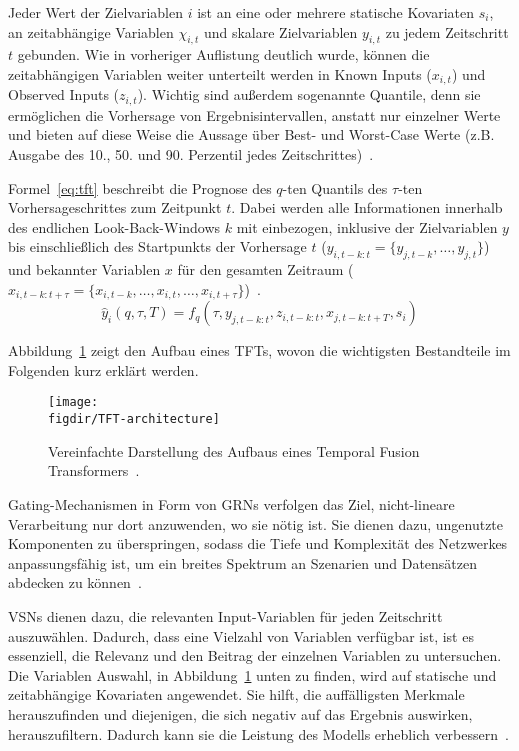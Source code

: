 Jeder Wert der Zielvariablen $i$ ist an eine oder mehrere statische Kovariaten $s_i$, an zeitabhängige Variablen $\chi_{i,t}$ und skalare Zielvariablen $y_{i,t}$ zu jedem Zeitschritt $t$ gebunden.
Wie in vorheriger Auflistung deutlich wurde, können die zeitabhängigen Variablen weiter unterteilt werden in Known Inputs ($x_{i,t}$) und Observed Inputs ($z_{i,t}$).
Wichtig sind außerdem sogenannte Quantile, denn sie ermöglichen die Vorhersage von Ergebnisintervallen, anstatt nur einzelner Werte und bieten auf diese Weise die Aussage über Best- und Worst-Case Werte (z.B. Ausgabe des 10., 50. und 90. Perzentil jedes Zeitschrittes)~\cite{Lim.19.12.2019}.

Formel~\ref{eq:tft} beschreibt die Prognose des $q$-ten Quantils des $\tau$-ten Vorhersageschrittes zum Zeitpunkt $t$.
Dabei werden alle Informationen innerhalb des endlichen Look-Back-Windows $k$ mit einbezogen, inklusive der Zielvariablen $y$ bis einschließlich des Startpunkts der Vorhersage $t$ ($y_{i,t-k:t} = \{y_{j,t-k}, \ldots, y_{j,t}\}$) und bekannter Variablen $x$ für den gesamten Zeitraum \newline ($x_{i,t-k:t+\tau} = \{x_{i,t-k}, \ldots, x_{i,t}, \ldots, x_{i,t+\tau}\}$)~\cite{Lim.19.12.2019}.
\begin{equation}
 \label{eq:tft}
 \hat{y}_i(q, \tau, T) = f_q(\tau, y_{j,t-k:t}, z_{i,t-k:t}, x_{j,t-k:t+T}, s_i)
\end{equation}

Abbildung~\ref{FIG:tft-architecture} zeigt den Aufbau eines \acp{TFT}, wovon die wichtigsten Bestandteile im Folgenden kurz erklärt werden.
\begin{figure}
 \caption[Aufbau eines Temporal Fusion Transformers]{Vereinfachte Darstellung des Aufbaus eines Temporal Fusion Transformers~\cite{Labiadh.2023}.}
 {\texttt{[image: \\figdir/TFT-architecture]}}
 \label{FIG:tft-architecture}
\end{figure}

Gating-Mechanismen in Form von \acp{GRN} verfolgen das Ziel, nicht-lineare Verarbeitung nur dort anzuwenden, wo sie nötig ist.
Sie dienen dazu, ungenutzte Komponenten zu überspringen, sodass die Tiefe und Komplexität des Netzwerkes anpassungsfähig ist, um ein breites Spektrum an Szenarien und Datensätzen abdecken zu können~\cite{Lim.19.12.2019}.

\acp{VSN} dienen dazu, die relevanten Input-Variablen für jeden Zeitschritt auszuwählen.
Dadurch, dass eine Vielzahl von Variablen verfügbar ist, ist es essenziell, die Relevanz und den Beitrag der einzelnen Variablen zu untersuchen.
Die Variablen Auswahl, in Abbildung~\ref{FIG:tft-architecture} unten zu finden, wird auf statische und zeitabhängige Kovariaten angewendet.
Sie hilft, die auffälligsten Merkmale herauszufinden und diejenigen, die sich negativ auf das Ergebnis auswirken, herauszufiltern.
Dadurch kann sie die Leistung des Modells erheblich verbessern~\cite{Lim.19.12.2019}.


